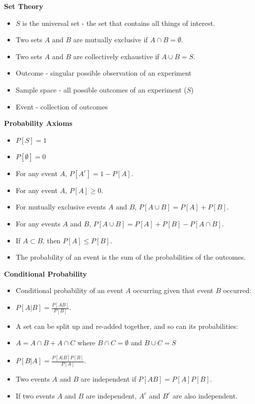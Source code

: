 \documentclass[8pt]{article}
\begin{document}
\textbf{Set Theory}
\begin{itemize}
    \item $S$ is the universal set - the set that contains all things of interest.
    \item Two sets $A$ and $B$ are mutually exclusive if $A \cap B = \emptyset$.
    \item Two sets $A$ and $B$ are collectively exhaustive if $A \cup B = S$.
    \item Outcome - singular possible observation of an experiment
    \item Sample space - all possible outcomes of an experiment ($S$)
    \item Event - collection of outcomes
\end{itemize}
\textbf{Probability Axioms}
\begin{itemize}
    \item $P[S] = 1$
    \item $P[\emptyset] = 0$
    \item For any event $A$, $P[A^c] = 1 - P[A]$.
    \item For any event $A$, $P[A] \geq 0$.
    \item For mutually exclusive events $A$ and $B$, $P[A \cup B] = P[A] + P[B]$.
    \item For any events $A$ and $B$, $P[A \cup B] = P[A] + P[B] - P[A \cap B]$.
    \item If $A \subset B$, then $P[A] \leq P[B]$.
    \item The probability of an event is the sum of the probabilities of the outcomes.
\end{itemize}
\textbf{Conditional Probability}
\begin{itemize}
    \item Conditional probability of an event $A$ occurring given that event $B$ occurred:
    \item $P[A | B] = \frac{P[AB]}{P[B]}$.
    \item A set can be split up and re-added together, and so can its probabilities:
    \item $A = A \cap B + A \cap C$ where $B \cap C = \emptyset$ and $B \cup C = S$
    \item $P[B | A] = \frac{P[A|B]P[B]}{P[A]}$.
    \item Two events $A$ and $B$ are independent if $P[AB] = P[A]P[B]$.
    \item If two events $A$ and $B$ are independent, $A^c$ and $B^c$ are also independent.
\end{itemize}
\end{document}
